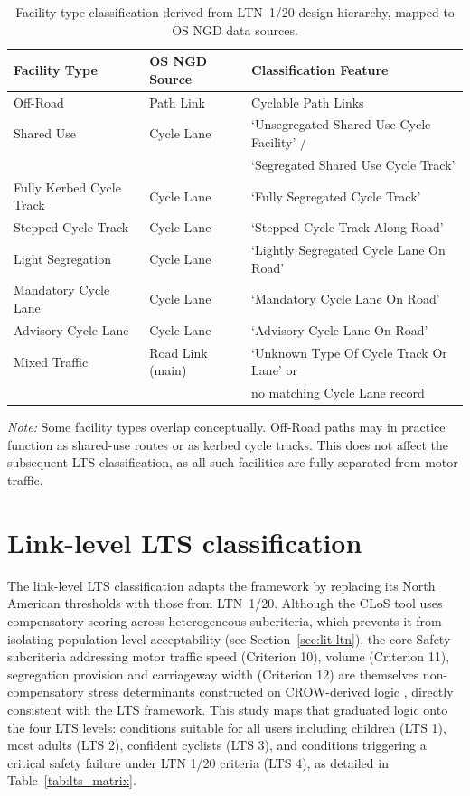 \begin{table}[h]
  \centering
  \caption{Facility type classification derived from LTN~1/20 design hierarchy, mapped to OS NGD data sources.}
  \label{tab:facility-types}
  \begin{tabular}{lll}
    \toprule
    Facility Type & OS NGD Source & Classification Feature \\
    \midrule
    Off-Road & Path Link & Cyclable Path Links \\
    Shared Use & Cycle Lane & `Unsegregated Shared Use Cycle Facility' / \\
     & & `Segregated Shared Use Cycle Track' \\
    Fully Kerbed Cycle Track & Cycle Lane & `Fully Segregated Cycle Track' \\
    Stepped Cycle Track & Cycle Lane & `Stepped Cycle Track Along Road' \\
    Light Segregation & Cycle Lane & `Lightly Segregated Cycle Lane On Road' \\
    Mandatory Cycle Lane & Cycle Lane & `Mandatory Cycle Lane On Road' \\
    Advisory Cycle Lane & Cycle Lane & `Advisory Cycle Lane On Road' \\
    Mixed Traffic & Road Link (main) & `Unknown Type Of Cycle Track Or Lane' or \\
     & & no matching Cycle Lane record \\
    \bottomrule
  \end{tabular}
  \par\smallskip
  \footnotesize\textit{Note:} Some facility types overlap conceptually. Off-Road paths may in practice function as shared-use routes or as kerbed cycle tracks. This does not affect the subsequent LTS classification, as all such facilities are fully separated from motor traffic.
\end{table}


\section{Link-level LTS classification}
\label{sec:method-linklts}

The link-level LTS classification adapts the \textcite{mekuria2012a} framework by replacing its North American thresholds with those from LTN~1/20. Although the CLoS tool uses compensatory scoring across heterogeneous subcriteria, which prevents it from isolating population-level acceptability (see Section~\ref{sec:lit-ltn}), the core Safety subcriteria addressing motor traffic speed (Criterion 10), volume (Criterion 11), segregation provision and carriageway width (Criterion 12) are themselves non-compensatory stress determinants constructed on CROW-derived logic \parencite{crow2016}, directly consistent with the LTS framework. This study maps that graduated logic onto the four LTS levels: conditions suitable for all users including children (LTS 1), most adults (LTS 2), confident cyclists (LTS 3), and conditions triggering a critical safety failure under LTN 1/20 criteria (LTS 4), as detailed in Table~\ref{tab:lts_matrix}.

